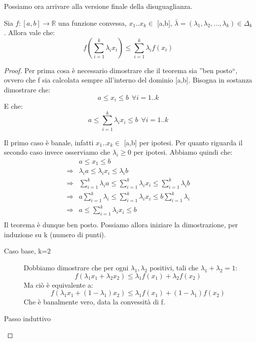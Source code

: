 Possiamo ora arrivare alla versione finale della disuguaglianza.

\bigskip

\begin{teorema}
 Sia $f: [a,b] \to \mathbb{R}$ una funzione convessa, $x_1..x_k \in$ [a,b], $\bar{\lambda}=(\lambda_1,\lambda_2,...,\lambda_k) \in \Delta_k$.
 Allora vale che:
 \[
 f \left( \sum_{i=1}^k \lambda_i x_i \right) \le \sum_{i=1}^k \lambda_i f(x_i)
 \]
\begin{proof}
 Per prima cosa è necessario dimostrare che il teorema sia ''ben posto``, ovvero che f sia calcolata sempre 
 all'interno del dominio [a,b].
 Bisogna in sostanza dimostrare che:
 \[
  a \le x_i \le b  \ \ \forall i=1..k
 \]
 E che:
 \[
  a \le \sum_{i=1}^k \lambda_i x_i \le b \ \ \forall i=1..k
 \]

 \noindent
 Il primo caso è banale, infatti $x_1..x_k \in$ [a,b] per ipotesi.
 Per quanto riguarda il secondo caso invece osserviamo che $\lambda_i \ge0$ per ipotesi.
 Abbiamo quindi che:
 \[\begin{split}
  & a \le x_1 \le b \\
  \Rightarrow & \lambda_i a \le \lambda_i x_i \le \lambda_i b \\
  \Rightarrow & \sum_{i=1}^k \lambda_i a \le \sum_{i=1}^k \lambda_i x_i \le \sum_{i=1}^k \lambda_i b \\
  \Rightarrow & a \sum_{i=1}^k \lambda_i \le \sum_{i=1}^k \lambda_i x_i \le b \sum_{i=1}^k \lambda_i \\
  \Rightarrow & a \le \sum_{i=1}^k \lambda_i x_i \le b \\
   \end{split}
 \]
Il teorema è dunque ben posto. Possiamo allora iniziare la dimostrazione, per induzione su k (numero di punti).

\begin{description}
 \item[Caso base, k=2]
  \mbox{}

  Dobbiamo dimostrare che per ogni $\lambda_1,\lambda_2$ positivi, tali che $\lambda_1+\lambda_2=1$:
  \[
   f( \lambda_1 x_1 + \lambda_2 x_2) \le \lambda_1 f(x_1) + \lambda_2 f(x_2)
  \]
  Ma ciò è equivalente a:
  \[
   f( \lambda_1 x_1 + (1-\lambda_1) x_2) \le \lambda_1 f(x_1) + (1-\lambda_1) f(x_2)
  \]
  Che è banalmente vero, data la convessità di f.

 \item[Passo induttivo]
\mbox{}


\end{description}
\end{proof}
\end{teorema}
